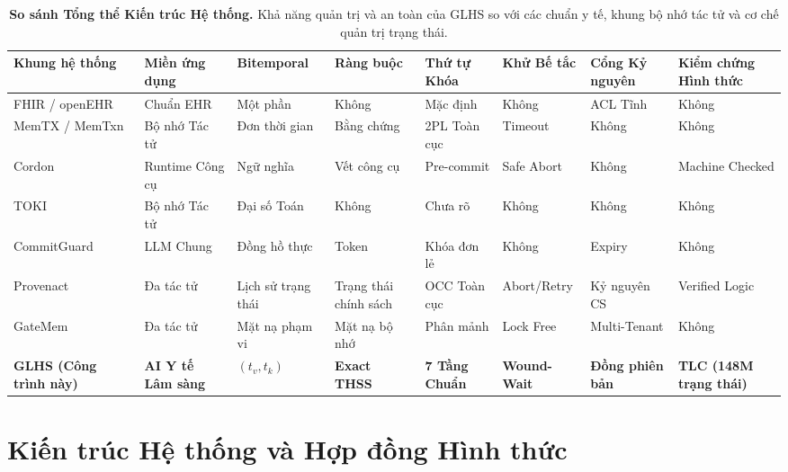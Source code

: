 \documentclass[11pt,a4paper]{article}
\begin{document}
\begin{table}[t]
\centering
\scriptsize
\caption{\textbf{So sánh Tổng thể Kiến trúc Hệ thống.} Khả năng quản trị và an toàn của GLHS so với các chuẩn y tế, khung bộ nhớ tác tử và cơ chế quản trị trạng thái.}
\label{tab:landscape}
\begin{tabularx}{\textwidth}{>{\raggedright\arraybackslash}p{2.3cm} >{\centering\arraybackslash}p{1.6cm} >{\centering\arraybackslash}p{1.4cm} >{\centering\arraybackslash}p{1.4cm} >{\centering\arraybackslash}p{1.4cm} >{\centering\arraybackslash}p{1.4cm} >{\centering\arraybackslash}p{1.5cm} >{\raggedright\arraybackslash}X}
\toprule
\textbf{Khung hệ thống} & \textbf{Miền ứng dụng} & \textbf{Bitemporal} & \textbf{Ràng buộc} & \textbf{Thứ tự Khóa} & \textbf{Khử Bế tắc} & \textbf{Cổng Kỷ nguyên} & \textbf{Kiểm chứng Hình thức}\\
\midrule
FHIR / openEHR~\cite{fhirprov,openehr} & Chuẩn EHR & Một phần & Không & Mặc định & Không & ACL Tĩnh & Không\\
MemTX / MemTxn~\cite{memtx,memtxn} & Bộ nhớ Tác tử & Đơn thời gian & Bằng chứng & 2PL Toàn cục & Timeout & Không & Không\\
Cordon~\cite{cordon} & Runtime Công cụ & Ngữ nghĩa & Vết công cụ & Pre-commit & Safe Abort & Không & Machine Checked\\
TOKI~\cite{toki} & Bộ nhớ Tác tử & Đại số Toán & Không & Chưa rõ & Không & Không & Không\\
CommitGuard~\cite{temporaryauth} & LLM Chung & Đồng hồ thực & Token & Khóa đơn lẻ & Không & Expiry & Không\\
Provenact~\cite{statefulgov} & Đa tác tử & Lịch sử trạng thái & Trạng thái chính sách & OCC Toàn cục & Abort/Retry & Kỷ nguyên CS & Verified Logic\\
GateMem~\cite{gatemem} & Đa tác tử & Mặt nạ phạm vi & Mặt nạ bộ nhớ & Phân mảnh & Lock Free & Multi-Tenant & Không\\
\midrule
\textbf{GLHS (Công trình này)} & \textbf{AI Y tế Lâm sàng} & \textbf{$(t_v, t_k)$} & \textbf{Exact THSS} & \textbf{7 Tầng Chuẩn} & \textbf{Wound-Wait} & \textbf{Đồng phiên bản} & \textbf{TLC (148M trạng thái)}\\
\bottomrule
\end{tabularx}
\end{table}

\section{Kiến trúc Hệ thống và Hợp đồng Hình thức}
\end{document}

